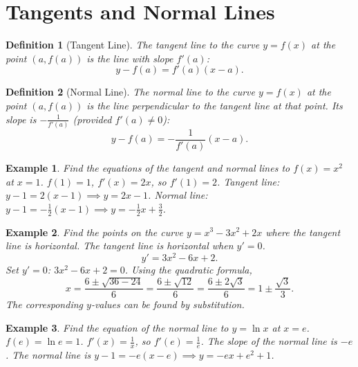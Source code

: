 \documentclass[11pt,a4paper]{article}
\newtheorem{example}{Example}
\newtheorem{definition}{Definition}
\begin{document}
\section{Tangents and Normal Lines}
\begin{definition}[Tangent Line]
The \textit{tangent line} to the curve $y = f(x)$ at the point $(a, f(a))$ is the line with slope $f'(a)$:
\[
y - f(a) = f'(a)(x - a).
\]
\end{definition}
\begin{definition}[Normal Line]
The \textit{normal line} to the curve $y = f(x)$ at the point $(a, f(a))$ is the line perpendicular to the tangent line at that point. Its slope is $-\frac{1}{f'(a)}$ (provided $f'(a) \neq 0$):
\[
y - f(a) = -\frac{1}{f'(a)}(x - a).
\]
\end{definition}
\begin{example}
Find the equations of the tangent and normal lines to $f(x) = x^2$ at $x = 1$.
$f(1) = 1$, $f'(x) = 2x$, so $f'(1) = 2$.
Tangent line: $y - 1 = 2(x - 1) \implies y = 2x - 1$.
Normal line: $y - 1 = -\frac{1}{2}(x - 1) \implies y = -\frac{1}{2}x + \frac{3}{2}$.
\end{example}
\begin{example}
Find the points on the curve $y = x^3 - 3x^2 + 2x$ where the tangent line is horizontal.
The tangent line is horizontal when $y' = 0$.
\[
y' = 3x^2 - 6x + 2.
\]
Set $y' = 0$: $3x^2 - 6x + 2 = 0$. Using the quadratic formula,
\[
x = \frac{6 \pm \sqrt{36 - 24}}{6} = \frac{6 \pm \sqrt{12}}{6} = \frac{6 \pm 2\sqrt{3}}{6} = 1 \pm \frac{\sqrt{3}}{3}.
\]
The corresponding $y$-values can be found by substitution.
\end{example}
\begin{example}
Find the equation of the normal line to $y = \ln x$ at $x = e$.
$f(e) = \ln e = 1$. $f'(x) = \frac{1}{x}$, so $f'(e) = \frac{1}{e}$.
The slope of the normal line is $-e$.
The normal line is $y - 1 = -e(x - e) \implies y = -ex + e^2 + 1$.
\end{example}
\end{document}
